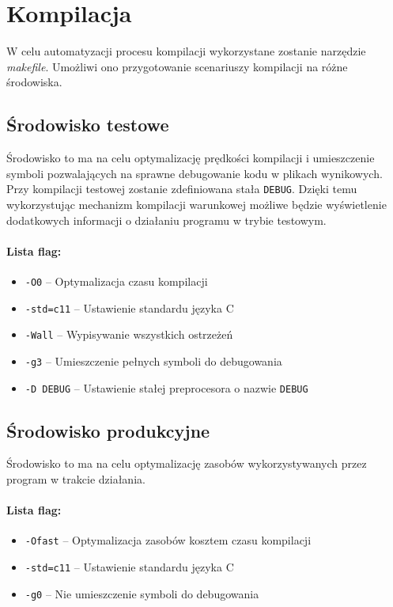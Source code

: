 \documentclass{article}
\begin{document}
\section{Kompilacja}
W celu automatyzacji procesu kompilacji wykorzystane zostanie narzędzie \textit{makefile}. Umożliwi ono przygotowanie scenariuszy kompilacji na różne środowiska.

\subsection{Środowisko testowe}
Środowisko to ma na celu optymalizację prędkości kompilacji i umieszczenie symboli pozwalających na sprawne debugowanie kodu w plikach wynikowych. Przy kompilacji testowej zostanie zdefiniowana stała \texttt{DEBUG}. Dzięki temu wykorzystując mechanizm kompilacji warunkowej możliwe będzie wyświetlenie dodatkowych informacji o działaniu programu w trybie testowym.

\paragraph{Lista flag:}
\begin{itemize}
	\item \texttt{-O0} -- Optymalizacja czasu kompilacji
	\item \texttt{-std=c11} -- Ustawienie standardu języka C
	\item \texttt{-Wall} -- Wypisywanie wszystkich ostrzeżeń
	\item \texttt{-g3} -- Umieszczenie pełnych symboli do debugowania
	\item \texttt{-D DEBUG} -- Ustawienie stałej preprocesora o nazwie \texttt{DEBUG}
\end{itemize}

\subsection{Środowisko produkcyjne}
Środowisko to ma na celu optymalizację zasobów wykorzystywanych przez program w trakcie działania.

\paragraph{Lista flag:}
\begin{itemize}
	\item \texttt{-Ofast} -- Optymalizacja zasobów kosztem czasu kompilacji
	\item \texttt{-std=c11} -- Ustawienie standardu języka C
	\item \texttt{-g0} -- Nie umieszczenie symboli do debugowania
\end{itemize}
\end{document}
